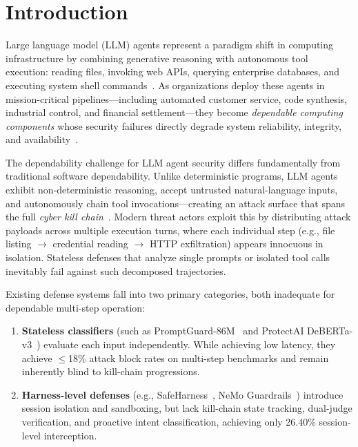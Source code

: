 \documentclass[conference]{IEEEtran}
\begin{document}
\section{Introduction}
Large language model (LLM) agents represent a paradigm shift in computing infrastructure by combining generative reasoning with autonomous tool execution: reading files, invoking web APIs, querying enterprise databases, and executing system shell commands~\cite{owasp2023,nist2023,yao2023react}. As organizations deploy these agents in mission-critical pipelines---including automated customer service, code synthesis, industrial control, and financial settlement---they become \textit{dependable computing components} whose security failures directly degrade system reliability, integrity, and availability~\cite{avizienis2004basic,dsn2024llm}.

The dependability challenge for LLM agent security differs fundamentally from traditional software dependability. Unlike deterministic programs, LLM agents exhibit non-deterministic reasoning, accept untrusted natural-language inputs, and autonomously chain tool invocations---creating an attack surface that spans the full \textit{cyber kill chain}~\cite{hutchins2011killchain}. Modern threat actors exploit this by distributing attack payloads across multiple execution turns, where each individual step (e.g., file listing $\rightarrow$ credential reading $\rightarrow$ HTTP exfiltration) appears innocuous in isolation. Stateless defenses that analyze single prompts or isolated tool calls inevitably fail against such decomposed trajectories.

Existing defense systems fall into two primary categories, both inadequate for dependable multi-step operation:
\begin{enumerate}[leftmargin=*]
    \item \textbf{Stateless classifiers} (such as PromptGuard-86M~\cite{llamafirewall2024} and ProtectAI DeBERTa-v3~\cite{protectai2024}) evaluate each input independently. While achieving low latency, they achieve $\leq$18\% attack block rates on multi-step benchmarks and remain inherently blind to kill-chain progressions.
    \item \textbf{Harness-level defenses} (e.g., SafeHarness~\cite{liu2024safeharness}, NeMo Guardrails~\cite{nemoguardrails2023}) introduce session isolation and sandboxing, but lack kill-chain state tracking, dual-judge verification, and proactive intent classification, achieving only 26.40\% session-level interception.
\end{enumerate}
\end{document}
